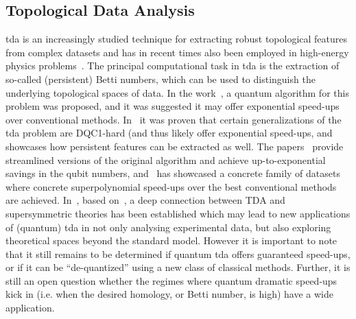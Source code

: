 \subsection{Topological Data Analysis}
\gls{tda} is an increasingly studied technique for extracting robust topological features from complex datasets and has in recent times also been employed in high-energy physics problems~\cite{sale2022probing}. The principal computational task in \gls{tda} is the extraction of so-called (persistent) Betti numbers, which can be used to distinguish the underlying topological spaces of data.  
 In the work~\cite{LloydNatComms2016}, a quantum algorithm for this problem was proposed, and it was suggested it may offer exponential speed-ups over conventional methods.
 In~\cite{GyurikQuantum2022, cade2021complexity} it was proven that certain generalizations of the \gls{tda} problem are DQC1-hard (and thus likely offer exponential speed-ups, and~\cite{HayakawaQuantum2022} showcases how persistent features can be extracted as well.
 The papers~\cite{ubaru2021quantum, berry2022quantifying, mcardle2022streamlined} provide streamlined versions of the original algorithm and achieve up-to-exponential savings in the qubit numbers, and~\cite{berry2022quantifying} has showcased a concrete family of datasets where concrete superpolynomial speed-ups over the best conventional methods are achieved.
 In~\cite{cade2021complexity, crichigno2022clique}, based on~\cite{WittenJDG1982}, a deep connection between TDA and supersymmetric theories has been established which may lead to new applications of (quantum) \gls{tda} in not only analysing experimental data, but also exploring theoretical spaces beyond the standard model.
 However it is important to note that it still remains to be determined if quantum \gls{tda} offers guaranteed speed-ups, or if it can be ``de-quantized'' using a new class of classical methods. Further, it is still an open question whether the regimes where quantum dramatic speed-ups kick in (i.e. when the desired homology, or Betti number, is high) have a wide application. 

